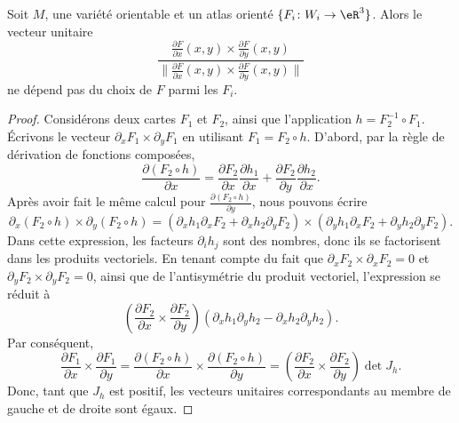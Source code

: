 \begin{proposition}
	Soit $M$, une variété orientable et un atlas orienté $\{ F_i\colon W_i\to \eR^3 \}$. Alors le vecteur unitaire
	\begin{equation}
		\frac{   \frac{ \partial F }{ \partial x }(x,y)\times\frac{ \partial F }{ \partial y }(x,y)   }{ \| \frac{ \partial F }{ \partial x }(x,y)\times\frac{ \partial F }{ \partial y }(x,y)\| }
	\end{equation}
	ne dépend pas du choix de $F$ parmi les $F_i$.
\end{proposition}


\begin{proof}
	Considérons deux cartes $F_1$ et $F_2$, ainsi que l'application $h=F_2^{-1}\circ F_1$. Écrivons le vecteur $\partial_x F_1\times\partial_yF_1$ en utilisant $F_1=F_2\circ h$. D'abord, par la règle de dérivation de fonctions composées,
	\begin{equation}
		\frac{ \partial (F_2\circ h) }{ \partial x }=\frac{ \partial F_2 }{ \partial x }\frac{ \partial h_1 }{ \partial x }+\frac{ \partial F_2 }{ \partial y }\frac{ \partial h_2 }{ \partial x }.
	\end{equation}
	Après avoir fait le même calcul pour $\frac{ \partial (F_2\circ h) }{ \partial y }$, nous pouvons écrire
	\begin{equation}
		\partial_x(F_2\circ h)\times\partial_y(F_2\circ h)=(\partial_xh_1\partial_xF_2+\partial_xh_2\partial_yF_2)\times(\partial_yh_1\partial_xF_2+\partial_yh_2\partial_yF_2).
	\end{equation}
	Dans cette expression, les facteurs $\partial_ih_j$ sont des nombres, donc ils se factorisent dans les produits vectoriels. En tenant compte du fait que $\partial_xF_2\times\partial_xF_2=0$ et $\partial_yF_2\times\partial_yF_2=0$, ainsi que de l'antisymétrie du produit vectoriel, l'expression se réduit à
	\begin{equation}
		\left( \frac{ \partial F_2 }{ \partial x }\times\frac{ \partial F_2 }{ \partial y } \right)(\partial_xh_1\partial_yh_2-\partial_xh_2\partial_yh_2).
	\end{equation}
	Par conséquent,
	\begin{equation}
		\frac{ \partial F_1 }{ \partial x }\times\frac{ \partial F_1 }{ \partial y } =\frac{ \partial (F_2\circ h) }{ \partial x }\times\frac{ \partial (F_2\circ h) }{ \partial y } =\left( \frac{ \partial F_2 }{ \partial x }\times\frac{ \partial F_2 }{ \partial y } \right)\det J_h.
	\end{equation}
	Donc, tant que $J_h$ est positif, les vecteurs unitaires correspondants au membre de gauche et de droite sont égaux.
\end{proof}

